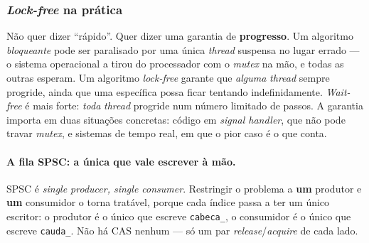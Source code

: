 \subsubsection{\emph{Lock-free} na prática}
\label{sec:lockfree}

\begin{porque}
Não quer dizer ``rápido''. Quer dizer uma garantia de \textbf{progresso}. Um
algoritmo \emph{bloqueante} pode ser paralisado por uma única \emph{thread}
suspensa no lugar errado --- o sistema operacional a tirou do processador com o
\emph{mutex} na mão, e todas as outras esperam. Um algoritmo \emph{lock-free}
garante que \emph{alguma} \emph{thread} sempre progride, ainda que uma
específica possa ficar tentando indefinidamente. \emph{Wait-free} é mais forte:
\emph{toda} \emph{thread} progride num número limitado de passos. A garantia
importa em duas situações concretas: código em \emph{signal handler}, que não
pode travar \emph{mutex}, e sistemas de tempo real, em que o pior caso é o que
conta.
\end{porque}

\paragraph{A fila SPSC: a única que vale escrever à mão.} SPSC é \emph{single
producer, single consumer}. Restringir o problema a \textbf{um} produtor e
\textbf{um} consumidor o torna tratável, porque cada índice passa a ter um único
escritor: o produtor é o único que escreve \texttt{cabeca\_}, o consumidor é o
único que escreve \texttt{cauda\_}. Não há CAS nenhum --- só um par
\emph{release}/\emph{acquire} de cada lado.

